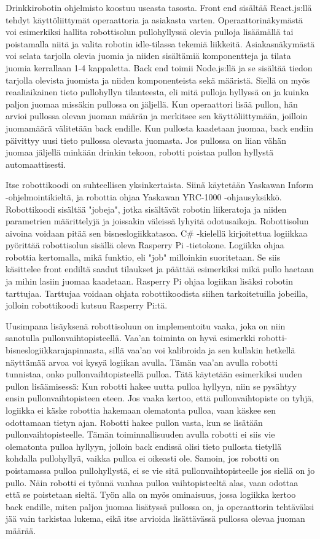 Drinkkirobotin ohjelmisto koostuu useasta tasosta. Front end sisältää React.js:llä tehdyt käyttöliittymät operaattoria ja asiakasta varten. Operaattorinäkymästä voi esimerkiksi hallita robottisolun pullohyllyssä olevia pulloja lisäämällä tai poistamalla niitä ja valita robotin idle\hyp{}tilassa tekemiä liikkeitä. Asiakasnäkymästä voi selata tarjolla olevia juomia ja niiden sisältämiä komponentteja ja tilata juomia kerrallaan 1\hyp{}4 kappaletta. Back end toimii Node.js:llä ja se sisältää tiedon tarjolla olevista juomista ja niiden komponenteista sekä määristä. Siellä on myös reaaliaikainen tieto pullohyllyn tilanteesta, eli mitä pulloja hyllyssä on ja kuinka paljon juomaa missäkin pullossa on jäljellä. Kun operaattori lisää pullon, hän arvioi pullossa olevan juoman määrän ja merkitsee sen käyttöliittymään, joilloin juomamäärä välitetään back endille. Kun pullosta kaadetaan juomaa, back endiin päivittyy uusi tieto pullossa olevasta juomasta. Jos pullossa on liian vähän juomaa jäljellä minkään drinkin tekoon, robotti poistaa pullon hyllystä automaattisesti.

Itse robottikoodi on suhteellisen yksinkertaista. Siinä käytetään Yaskawan Inform \hyp{}ohjelmointikieltä, ja robottia ohjaa Yaskawan YRC-1000 -ohjausyksikkö. Robottikoodi sisältää "jobeja", jotka sisältävät robotin liikeratoja ja niiden parametrien määrittelyjä ja joissakin väleissä lyhyitä odotusaikoja. Robottisolun aivoina voidaan pitää sen bisneslogiikkatasoa. C\# -kielellä kirjoitettua logiikkaa pyörittää robottisolun sisällä oleva Rasperry Pi -tietokone. Logiikka ohjaa robottia kertomalla, mikä funktio, eli "job" milloinkin suoritetaan. Se siis käsittelee front endiltä saadut tilaukset ja päättää esimerkiksi mikä pullo haetaan ja mihin lasiin juomaa kaadetaan. Rasperry Pi ohjaa logiikan lisäksi robotin tarttujaa. Tarttujaa voidaan ohjata robottikoodista siihen tarkoitetuilla jobeilla, jolloin robottikoodi kutsuu Rasperry Pi:tä.

Uusimpana lisäyksenä robottisoluun on implementoitu vaaka, joka on niin sanotulla pullonvaihtopisteellä. Vaa'an toiminta on hyvä esimerkki robotti-bisneslogiikkarajapinnasta, sillä vaa'an voi kalibroida ja sen kullakin hetkellä näyttämää arvoa voi kysyä logiikan avulla. Tämän vaa'an avulla robotti tunnistaa, onko pullonvaihtopisteellä pulloa. Tätä käytetään esimerkiksi uuden pullon lisäämisessä: Kun robotti hakee uutta pulloa hyllyyn, niin se pysähtyy ensin pullonvaihtopisteen eteen. Jos vaaka kertoo, että pullonvaihtopiste on tyhjä, logiikka ei käske robottia hakemaan olematonta pulloa, vaan käskee sen odottamaan tietyn ajan. Robotti hakee pullon vasta, kun se lisätään pullonvaihtopisteelle. Tämän toiminnallisuuden avulla robotti ei siis vie olematonta pulloa hyllyyn, jolloin back endissä olisi tieto pullosta tietyllä kohdalla pullohyllyä, vaikka pulloa ei oikeasti ole. Samoin, jos robotti on poistamassa pulloa pullohyllystä, ei se vie sitä pullonvaihtopisteelle jos siellä on jo pullo. Näin robotti ei työnnä vanhaa pulloa vaihtopisteeltä alas, vaan odottaa että se poistetaan sieltä. Työn alla on myös ominaisuus, jossa logiikka kertoo back endille, miten paljon juomaa lisätyssä pullossa on, ja operaattorin tehtäväksi jää vain tarkistaa lukema, eikä itse arvioida lisättävässä pullossa olevaa juoman määrää.

